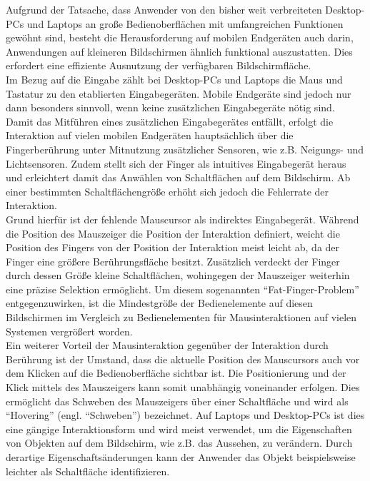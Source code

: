 \documentclass[a4paper,12pt,bibliography=totoc]{scrreprt}%
\begin{document}
Aufgrund der Tatsache, dass Anwender von den bisher weit verbreiteten Desktop-PCs und Laptops an große Bedienoberflächen mit umfangreichen Funktionen gewöhnt sind, besteht die Herausforderung auf mobilen Endgeräten auch darin, Anwendungen auf kleineren Bildschirmen ähnlich funktional auszustatten. Dies erfordert eine effiziente Ausnutzung der verfügbaren Bildschirmfläche.\\
Im Bezug auf die Eingabe zählt bei Desktop-PCs und Laptops die Maus und Tastatur zu den etablierten Eingabegeräten.  Mobile Endgeräte sind jedoch nur dann besonders sinnvoll, wenn keine zusätzlichen Eingabegeräte nötig sind. Damit das Mitführen eines zusätzlichen Eingabegerätes entfällt, erfolgt die Interaktion auf vielen mobilen Endgeräten hauptsächlich über die Fingerberührung unter Mitnutzung zusätzlicher Sensoren, wie z.B. Neigungs- und Lichtsensoren. Zudem stellt sich der Finger als intuitives Eingabegerät heraus und erleichtert damit das Anwählen von Schaltflächen auf dem Bildschirm. Ab einer bestimmten Schaltflächengröße erhöht sich jedoch die Fehlerrate der Interaktion.\cite{mousetouchmk}\\
Grund hierfür ist der fehlende Mauscursor als indirektes Eingabegerät. Während die Position des Mauszeiger die Position der Interaktion definiert, weicht die Position des Fingers von der Position der Interaktion meist leicht ab, da der Finger eine größere Berührungsfläche besitzt. Zusätzlich verdeckt der Finger durch dessen Größe kleine Schaltflächen, wohingegen der Mauszeiger weiterhin eine präzise Selektion ermöglicht. Um diesem sogenannten "`Fat-Finger-Problem"' \cite{monkeys} entgegenzuwirken, ist die Mindestgröße der Bedienelemente auf diesen Bildschirmen im Vergleich zu Bedienelementen für Mausinteraktionen auf vielen Systemen vergrößert worden.\cite{jin}\\
Ein weiterer Vorteil der Mausinteraktion gegenüber der Interaktion durch Berührung ist der Umstand, dass die aktuelle Position des Mauscursors auch vor dem Klicken auf die Bedienoberfläche sichtbar ist. Die Positionierung und der Klick mittels des Mauszeigers kann somit unabhängig voneinander erfolgen. Dies ermöglicht das Schweben des Mauszeigers über einer Schaltfläche und wird als "`Hovering"' (engl. "`Schweben"') bezeichnet. Auf Laptops und Desktop-PCs ist dies eine gängige Interaktionsform und wird meist verwendet, um die Eigenschaften von Objekten auf dem Bildschirm, wie z.B. das Aussehen, zu verändern. Durch derartige Eigenschaftsänderungen kann der Anwender das Objekt beispielsweise leichter als Schaltfläche identifizieren.
\end{document}
